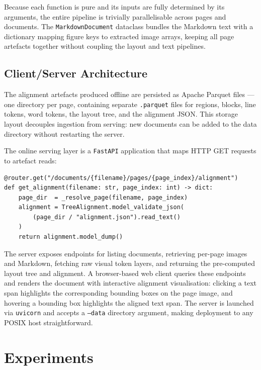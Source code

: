 \documentclass{article}
\theoremstyle{definition}
\begin{document}
Because each function is pure and its inputs are fully determined by its
arguments, the entire pipeline is trivially parallelisable across pages and
documents.  The \texttt{MarkdownDocument} dataclass bundles the Markdown text
with a dictionary mapping figure keys to extracted image arrays, keeping all
page artefacts together without coupling the layout and text pipelines.

\subsection{Client/Server Architecture}
\label{sec:server}

The alignment artefacts produced offline are persisted as Apache Parquet
files --- one directory per page, containing separate \texttt{.parquet}
files for regions, blocks, line tokens, word tokens, the layout tree, and
the alignment JSON.  This storage layout decouples ingestion from serving:
new documents can be added to the data directory without restarting the
server.

The online serving layer is a \texttt{FastAPI} application that maps HTTP
GET requests to artefact reads:

\begin{lstlisting}
@router.get("/documents/{filename}/pages/{page_index}/alignment")
def get_alignment(filename: str, page_index: int) -> dict:
    page_dir  = _resolve_page(filename, page_index)
    alignment = TreeAlignment.model_validate_json(
        (page_dir / "alignment.json").read_text()
    )
    return alignment.model_dump()
\end{lstlisting}

The server exposes endpoints for listing documents, retrieving per-page
images and Markdown, fetching raw visual token layers, and returning the
pre-computed layout tree and alignment.  A browser-based web client queries
these endpoints and renders the document with interactive alignment
visualisation: clicking a text span highlights the corresponding bounding
boxes on the page image, and hovering a bounding box highlights the aligned
text span.  The server is launched via \texttt{uvicorn} and accepts a
\texttt{--data} directory argument, making deployment to any POSIX host
straightforward.

\section{Experiments}
\end{document}
